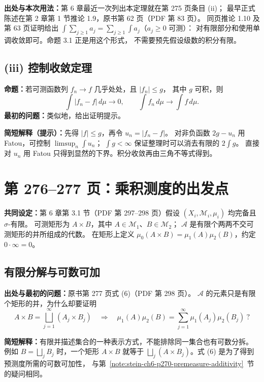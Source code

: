 \documentclass[UTF8,a4paper,11pt]{ctexart}
\begin{document}
\textbf{出处与本次用法：}第 6 章最近一次列出本定理就在第 275 页条目 (ii)；
最早正式陈述在第 2 章第 1 节推论 1.9，原书第 62 页（PDF 第 83 页）。
同页推论 1.10 及第 63 页证明给出
$\int\sum_{j\geq1}a_j=\sum_{j\geq1}\int a_j$（$a_j\geq0$ 可测）：
对有限部分和使用单调收敛即可。命题 3.1 正是用这个形式，
不需要预先假设级数的积分有限。

\subsection*{(iii) 控制收敛定理}
\label{note:stein-ch6-p275-dct}
\textbf{命题：}若可测函数列 $f_n\to f$ 几乎处处，且 $|f_n|\leq g$，
其中 $g$ 可积，则
\[
\int|f_n-f|\,d\mu\longrightarrow0,
\qquad \int f_n\,d\mu\longrightarrow\int f\,d\mu.
\]
\textbf{最初的问题：}类似地，给出证明提示。

\textbf{简短解释（提示）：}先得 $|f|\leq g$，再令 $u_n=|f_n-f|$。
对非负函数 $2g-u_n$ 用 Fatou，可控制 $\limsup_n\int u_n$；
$\int g<\infty$ 保证整理时可以消去有限的 $2\int g$。
直接对 $u_n$ 用 Fatou 只得到显然的下界。积分收敛再由三角不等式得到。
\endgroup

\newpage
\section{第 276--277 页：乘积测度的出发点}
\textbf{共同设定：}第 6 章第 3.1 节（PDF 第 297--298 页）假设
$(X_i,\mathcal M_i,\mu_i)$ 均完备且 $\sigma$-有限。
可测矩形为 $A\times B$，其中 $A\in\mathcal M_1$、$B\in\mathcal M_2$；
$\mathcal A$ 是有限个两两不交可测矩形的并所组成的代数。
在矩形上定义 $\mu_0(A\times B)=\mu_1(A)\mu_2(B)$，约定 $0\cdot\infty=0$。

\subsection{有限分解与可数可加}
\label{note:stein-ch6-p277-rectangle-premeasure}
\textbf{出处与最初的问题：}原书第 277 页式 (6)（PDF 第 298 页）。
$\mathcal A$ 的元素只是有限个矩形的并，为什么却要证明
\[
A\times B=\bigsqcup_{j=1}^{\infty}(A_j\times B_j)
\quad\Longrightarrow\quad
\mu_1(A)\mu_2(B)=\sum_{j=1}^{\infty}\mu_1(A_j)\mu_2(B_j)\ ?
\]

\textbf{简短解释：}有限并描述集合的一种表示方式，不能排除同一集合也有可数分拆。
例如 $B=\bigsqcup_jB_j$ 时，一个矩形 $A\times B$ 就等于
$\bigsqcup_j(A\times B_j)$。式 (6) 是为了得到预测度所需的可数可加性，
与第~\ref{note:stein-ch6-p270-premeasure-additivity}~节的疑问相同。
\end{document}
